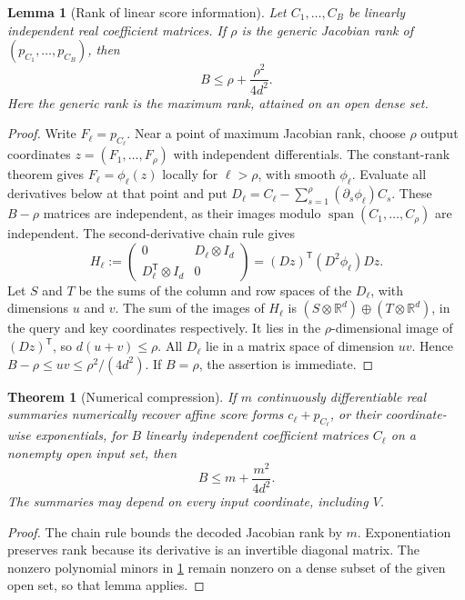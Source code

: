 \documentclass[11pt]{article}
\newtheorem{theorem}{Theorem}[section]
\newtheorem{lemma}[lemma]{Lemma}
\theoremstyle{definition}
\theoremstyle{remark}
\newcommand{\R}{\mathbb R}
\begin{document}
\begin{lemma}[Rank of linear score information]
\label{lem:pair-rank}
Let $C_1,\ldots,C_B$ be linearly independent real coefficient matrices.
If $\rho$ is the generic Jacobian rank of
$(p_{C_1},\ldots,p_{C_B})$, then
\begin{equation}
 B\le\rho+\frac{\rho^2}{4d^2}.
 \label{eq:pair-rank}
\end{equation}
Here the generic rank is the maximum rank, attained on an open dense set.
\end{lemma}
\begin{proof}
Write $F_\ell=p_{C_\ell}$. Near a point of maximum Jacobian rank,
choose $\rho$ output coordinates $z=(F_1,\ldots,F_\rho)$ with
independent differentials. The constant-rank theorem gives
$F_\ell=\phi_\ell(z)$ locally for $\ell>\rho$, with smooth
$\phi_\ell$. Evaluate all derivatives below at that point and put
$D_\ell=C_\ell-\sum_{s=1}^\rho(\partial_s\phi_\ell)C_s$.
These $B-\rho$ matrices are independent, as their images modulo
$\operatorname{span}(C_1,\ldots,C_\rho)$ are independent.
The second-derivative chain rule gives
\[
 H_\ell:=
 \begin{pmatrix}0&D_\ell\otimes I_d\\
 D_\ell^{\mathsf T}\otimes I_d&0\end{pmatrix}
 =(Dz)^{\mathsf T}(D^2\phi_\ell)Dz.
\]
Let $S$ and $T$ be the sums of the column and row spaces of the
$D_\ell$, with dimensions $u$ and $v$. The sum of the images of
$H_\ell$ is $(S\otimes\R^d)\oplus(T\otimes\R^d)$, in the query
and key coordinates respectively. It lies in the $\rho$-dimensional
image of $(Dz)^{\mathsf T}$, so $d(u+v)\le\rho$.
All $D_\ell$ lie in a matrix space of dimension $uv$. Hence
$B-\rho\le uv\le\rho^2/(4d^2)$. If $B=\rho$, the assertion
is immediate.
\end{proof}

\begin{theorem}[Numerical compression]
\label{thm:compression}
If $m$ continuously differentiable real summaries numerically recover
affine score forms $c_\ell+p_{C_\ell}$, or their coordinate-wise
exponentials, for $B$ linearly independent coefficient matrices
$C_\ell$ on a nonempty open input set, then
\begin{equation}
 B\le m+\frac{m^2}{4d^2}.
 \label{eq:compression}
\end{equation}
The summaries may depend on every input coordinate, including $V$.
\end{theorem}
\begin{proof}
The chain rule bounds the decoded Jacobian rank by $m$.
Exponentiation preserves rank because its derivative is an invertible
diagonal matrix. The nonzero polynomial minors in
\cref{lem:pair-rank} remain nonzero on a dense subset of the given open
set, so that lemma applies.
\end{proof}
\end{document}
